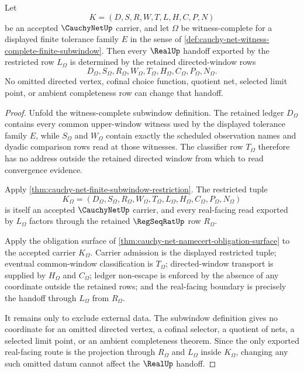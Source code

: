 \begin{theorem}\label{thm:cauchy-net-directed-window-localization}
Let
$$
K=(D,S,R,W,T,L,H,C,P,N)
$$
be an accepted $\CauchyNetUp$ carrier, and let $\Omega$ be witness-complete for a displayed finite tolerance family $E$ in the sense of \autoref{def:cauchy-net-witness-complete-finite-subwindow}. Then every $\RealUp$ handoff exported by the restricted row $L_{\Omega}$ is determined by the retained directed-window rows
$$
D_{\Omega},S_{\Omega},R_{\Omega},W_{\Omega},T_{\Omega},H_{\Omega},C_{\Omega},P_{\Omega},N_{\Omega}.
$$
No omitted directed vertex, cofinal choice function, quotient net, selected limit point, or ambient completeness row can change that handoff.
\end{theorem}
\begin{proof}
Unfold the witness-complete subwindow definition. The retained ledger $D_{\Omega}$ contains every common upper-window witness used by the displayed tolerance family $E$, while $S_{\Omega}$ and $W_{\Omega}$ contain exactly the scheduled observation names and dyadic comparison rows read at those witnesses. The classifier row $T_{\Omega}$ therefore has no address outside the retained directed window from which to read convergence evidence.

Apply \autoref{thm:cauchy-net-finite-subwindow-restriction}. The restricted tuple
$$
K_{\Omega}=(D_{\Omega},S_{\Omega},R_{\Omega},W_{\Omega},T_{\Omega},L_{\Omega},H_{\Omega},C_{\Omega},P_{\Omega},N_{\Omega})
$$
is itself an accepted $\CauchyNetUp$ carrier, and every real-facing read exported by $L_{\Omega}$ factors through the retained $\RegSeqRatUp$ row $R_{\Omega}$.

Apply the obligation surface of \autoref{thm:cauchy-net-namecert-obligation-surface} to the accepted carrier $K_{\Omega}$. Carrier admission is the displayed restricted tuple; eventual common-window classification is $T_{\Omega}$; directed-window transport is supplied by $H_{\Omega}$ and $C_{\Omega}$; ledger non-escape is enforced by the absence of any coordinate outside the retained rows; and the real-facing boundary is precisely the handoff through $L_{\Omega}$ from $R_{\Omega}$.

It remains only to exclude external data. The subwindow definition gives no coordinate for an omitted directed vertex, a cofinal selector, a quotient of nets, a selected limit point, or an ambient completeness theorem. Since the only exported real-facing route is the projection through $R_{\Omega}$ and $L_{\Omega}$ inside $K_{\Omega}$, changing any such omitted datum cannot affect the $\RealUp$ handoff.
\end{proof}

